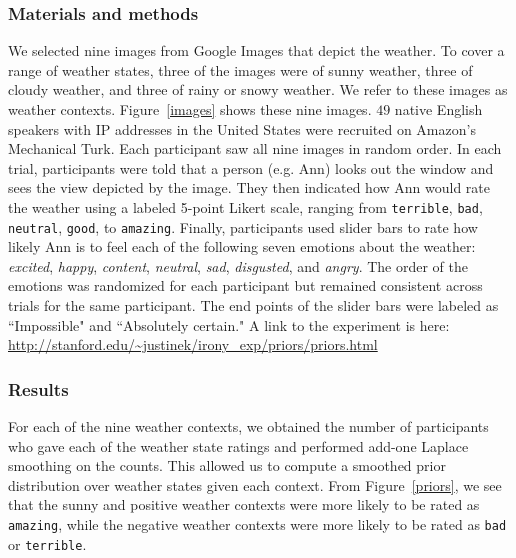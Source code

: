 \documentclass[10pt,letterpaper]{article}
\begin{document}
\subsubsection{Materials and methods}
We selected nine images from Google Images that depict the weather. To cover a range of weather states, three of the images were of sunny weather, three of cloudy weather, and three of rainy or snowy weather. We refer to these images as weather contexts. Figure~\ref{images} shows these nine images.
$49$ native English speakers with IP addresses in the United States were recruited on Amazon's Mechanical Turk. Each participant saw all nine images in random order. In each trial, participants were told that a person (e.g. Ann) looks out the window and sees the view depicted by the image. They then indicated how Ann would rate the weather using a labeled 5-point Likert scale, ranging from \texttt{terrible}, \texttt{bad}, \texttt{neutral}, \texttt{good}, to \texttt{amazing}. Finally, participants used slider bars to rate how likely Ann is to feel each of the following seven emotions about the weather: \emph{excited}, \emph{happy}, \emph{content}, \emph{neutral}, \emph{sad}, \emph{disgusted}, and \emph{angry}.  The order of the emotions was randomized for each participant but remained consistent across trials for the same participant. The end points of the slider bars were labeled as ``Impossible" and ``Absolutely certain." A link to the experiment is here: \url{http://stanford.edu/~justinek/irony_exp/priors/priors.html}
  
 
\subsubsection{Results}

For each of the nine weather contexts, we obtained the number of participants who gave each of the weather state ratings and performed add-one Laplace smoothing on the counts. This allowed us to compute a smoothed prior distribution over weather states given each context. From Figure~\ref{priors}, we see that the sunny and positive weather contexts were more likely to be rated as \texttt{amazing}, while the negative weather contexts were more likely to be rated as \texttt{bad} or \texttt{terrible}.  %
\end{document}
